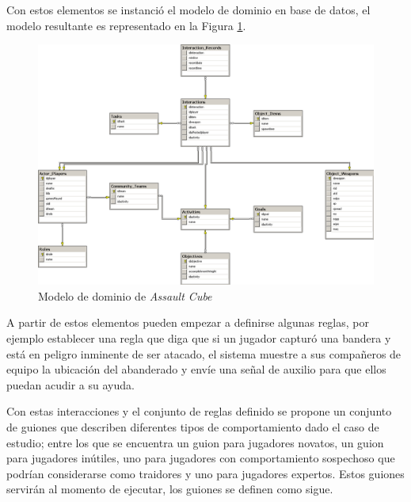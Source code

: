 Con estos elementos se instanci\'o el modelo de dominio en base de datos, el modelo resultante es representado en la Figura \ref{fig:DomModel}.
\newpage
\begin{figure}[h]
\centering
\includegraphics[width=0.7\linewidth]{images/GameModelDiagram}
\caption{Modelo de dominio de \textit{Assault Cube}}
\label{fig:DomModel}
\end{figure}


A partir de estos elementos pueden empezar a definirse algunas reglas, por ejemplo establecer una regla que diga que si un jugador captur\'o una bandera y est\'a en peligro inminente de ser atacado, el sistema muestre a sus compa\~neros de equipo la ubicaci\'on del abanderado y env\'ie una se\~nal de auxilio para que ellos puedan acudir a su ayuda.

Con estas interacciones y el conjunto de reglas definido se propone un conjunto de guiones que describen diferentes tipos de comportamiento dado el caso de estudio; entre los que se encuentra un guion para jugadores novatos, un guion para jugadores in\'utiles, uno para jugadores con comportamiento sospechoso que podr\'ian considerarse como traidores y uno para jugadores expertos. Estos guiones servir\'an al momento de ejecutar, los guiones se definen como sigue.

